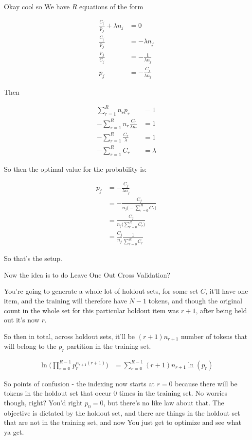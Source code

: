 \documentclass{article}
\begin{document}
		Okay cool so We have $R$ equations of the form
		
		\begin{align}
			\frac{C_j}{p_j} + \lambda n_j &= 0\\
			\frac{C_j}{p_j} &= - \lambda n_j \\
			\frac{p_j}{C_j} &= - \frac{1}{\lambda n_j} \\
			p_j &= - \frac{C_j}{\lambda n_j} 
		\end{align}
		
		Then
		
		\begin{align}
			\sum^R_{r=1} n_r p_r &= 1\\
			-\sum^R_{r=1} n_r \frac{C_r}{\lambda n_r} &= 1\\
			-\sum^R_{r=1} \frac{C_r}{\lambda} &= 1\\
			-\sum^R_{r=1} C_r &= \lambda
		\end{align}
		
		So then the optimal value for the probability is:
		
		\begin{align}
			p_j &= - \frac{C_j}{\lambda n_j}\\
			&= - \frac{C_j}{n_j \bigg(-\sum^R_{r=0} C_r\bigg)}\\
			&= \frac{C_j}{n_j \bigg(\sum^R_{r=0} C_r\bigg)} \\
			&= \frac{C_j}{n_j}\frac{1}{\sum^R_{r=0} C_r} 
		\end{align}
		
		So that's the setup.
		
		Now the idea is to do Leave One Out Cross Validation?
		
		You're going to generate a whole lot of holdout sets, for some set $C$, it'll have one item, and the training will therefore have $N-1$ tokens, and though the original count in the whole set for this particular holdout item was $r+1$, after being held out it's now $r$.
		
		So then in total, across holdout sets, it'll be $(r+1)n_{r+1}$ number of tokens that will belong to the $p_r$ partition in the training set.
		
		\begin{align}
			\ln\bigg(\prod^{R-1}_{r=0} p_r^{n_{r+1}(r+1)} \bigg) &= \sum_{r=0}^{R-1} (r+1)n_{r+1}\ln(p_r)
		\end{align}
		
		So points of confusion - the indexing now starts at $r=0$ because there will be tokens in the holdout set that occur 0 times in the training set. No worries though, right? You'd right $p_0=0$, but there's no like law about that. The objective is dictated by the holdout set, and there are things in the holdout set that are not in the training set, and now You just get to optimize and see what ya get.
		
\end{document}
